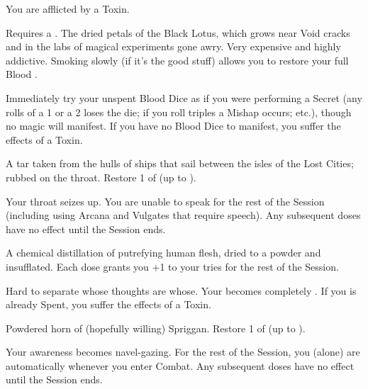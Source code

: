   You are afflicted by a  Toxin.



   Requires a . The dried petals of the Black Lotus, which grows near Void cracks and in the labs of magical experiments gone awry. Very expensive and highly addictive.  Smoking slowly (if it's the good stuff) allows you to restore your full Blood \POOL.

    Immediately try  your unspent Blood Dice as if you were performing a Secret (any rolls of a 1 or a 2 loses the die; if you roll triples a Mishap occurs; etc.), though no magic will manifest. If you have no Blood Dice to manifest, you suffer the effects of a  Toxin.





  A tar taken from the hulls of ships that sail between the isles of the Lost Cities; rubbed on the throat. Restore 1 \UD of \PRE (up to \MAX).

   Your throat seizes up.  You are unable to speak for the rest of the Session (including using Arcana and Vulgates that require speech). Any subsequent doses have no effect until the Session ends.



  A chemical distillation of putrefying human flesh, dried to a powder and insufflated. Each dose grants you +1 to your \INT tries for the rest of the Session.

    Hard to separate whose thoughts are whose. Your \AWA becomes completely . If you \AWA is already Spent, you suffer the effects of a  Toxin.



  Powdered horn of (hopefully willing) Spriggan. Restore 1 \UD of \AWA (up to \MAX).

   Your awareness becomes navel-gazing. For the rest of the Session, you (alone) are automatically  whenever you enter Combat. Any subsequent doses have no effect until the Session ends.



